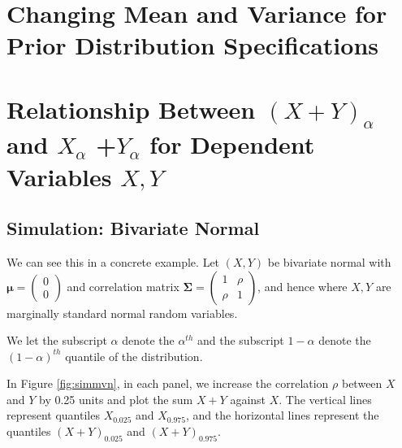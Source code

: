 \documentclass[12pt,twoside]{smiththesis}
\begin{document}
\hypertarget{changing-mean-and-variance-for-prior-distribution-specifications}{%
\section{Changing Mean and Variance for Prior Distribution Specifications}\label{changing-mean-and-variance-for-prior-distribution-specifications}}

\hypertarget{relationship-between-xy_alpha-and-x_alpha-y_alpha-for-dependent-variables-xy}{%
\section{\texorpdfstring{Relationship Between \((X+Y)_\alpha\) and \(X_{\alpha}\) +\(Y_{\alpha}\) for Dependent Variables \(X,Y\)}{Relationship Between (X+Y)\_\textbackslash alpha and X\_\{\textbackslash alpha\} +Y\_\{\textbackslash alpha\} for Dependent Variables X,Y}}\label{relationship-between-xy_alpha-and-x_alpha-y_alpha-for-dependent-variables-xy}}

\hypertarget{simulation-bivariate-normal}{%
\subsection{Simulation: Bivariate Normal}\label{simulation-bivariate-normal}}

We can see this in a concrete example. Let \((X,Y)\) be bivariate normal with \(\boldsymbol \mu = \begin{pmatrix} 0\\0\end{pmatrix}\) and correlation matrix \(\boldsymbol \Sigma = \begin{pmatrix} 1 & \rho \\ \rho & 1 \end{pmatrix}\), and hence where \(X, Y\) are marginally standard normal random variables.

We let the subscript \(\alpha\) denote the \(\alpha^{th}\) and the subscript \(1-\alpha\) denote the \((1-\alpha)^{th}\) quantile of the distribution.

In Figure \ref{fig:simmvn}, in each panel, we increase the correlation \(\rho\) between \(X\) and \(Y\) by 0.25 units and plot the sum \(X +Y\) against \(X\). The vertical lines represent quantiles \(X_{0.025}\) and \(X_{0.975}\), and the horizontal lines represent the quantiles \((X+Y)_{0.025}\) and \((X+Y)_{0.975}\).
\end{document}
